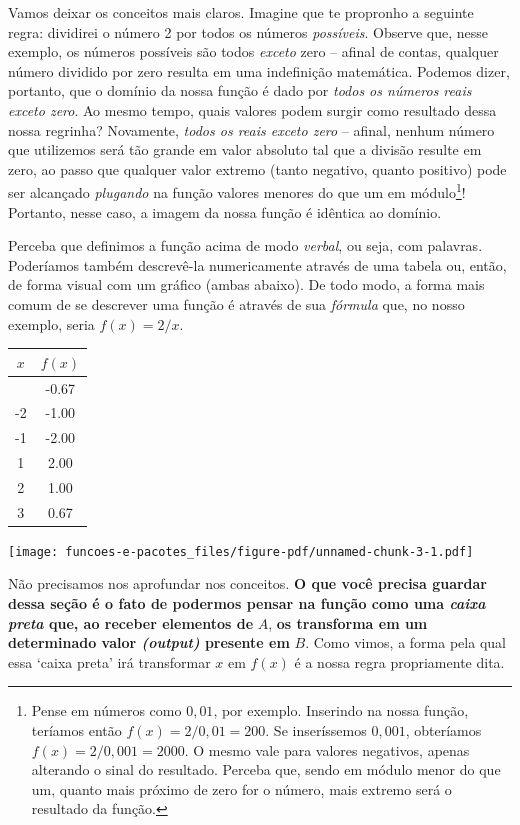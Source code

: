 \documentclass[
  letterpaper,
  DIV=11,
  numbers=noendperiod]{scrreprt}
\begin{document}
Vamos deixar os conceitos mais claros. Imagine que te propronho a
seguinte regra: dividirei o número 2 por todos os números
\emph{possíveis}. Observe que, nesse exemplo, os números possíveis são
todos \emph{exceto} zero -- afinal de contas, qualquer número dividido
por zero resulta em uma indefinição matemática. Podemos dizer, portanto,
que o domínio da nossa função é dado por \emph{todos os números reais
exceto zero}. Ao mesmo tempo, quais valores podem surgir como resultado
dessa nossa regrinha? Novamente, \emph{todos os reais exceto zero} --
afinal, nenhum número que utilizemos será tão grande em valor absoluto
tal que a divisão resulte em zero, ao passo que qualquer valor extremo
(tanto negativo, quanto positivo) pode ser alcançado \emph{plugando} na
função valores menores do que um em módulo\footnote{Pense em números
  como \(0,01\), por exemplo. Inserindo na nossa função, teríamos então
  \(f(x)=2/0,01=200\). Se inseríssemos \(0,001\), obteríamos
  \(f(x)=2/0,001=2000\). O mesmo vale para valores negativos, apenas
  alterando o sinal do resultado. Perceba que, sendo em módulo menor do
  que um, quanto mais próximo de zero for o número, mais extremo será o
  resultado da função.}! Portanto, nesse caso, a imagem da nossa função
é idêntica ao domínio.

Perceba que definimos a função acima de modo \emph{verbal}, ou seja, com
palavras. Poderíamos também descrevê-la numericamente através de uma
tabela ou, então, de forma visual com um gráfico (ambas abaixo). De todo
modo, a forma mais comum de se descrever uma função é através de sua
\emph{fórmula} que, no nosso exemplo, seria \(f(x)=2/x\).

\begin{longtable}[]{@{}cc@{}}
\toprule\noalign{}
\(x\) & \(f(x)\) \\
\midrule\noalign{}
\endhead
\bottomrule\noalign{}
\endlastfoot
-3 & -0.67 \\
-2 & -1.00 \\
-1 & -2.00 \\
1 & 2.00 \\
2 & 1.00 \\
3 & 0.67 \\
\end{longtable}

\texttt{[image: funcoes-e-pacotes\_files/figure-pdf/unnamed-chunk-3-1.pdf]}

Não precisamos nos aprofundar nos conceitos. \textbf{O que você precisa
guardar dessa seção é o fato de podermos pensar na função como uma
\emph{caixa preta} que, ao receber elementos de} \(A\), \textbf{os
transforma em um determinado valor \emph{(output)} presente em} \(B\).
Como vimos, a forma pela qual essa `caixa preta' irá transformar \(x\)
em \(f(x)\) é a nossa regra propriamente dita.
\end{document}
